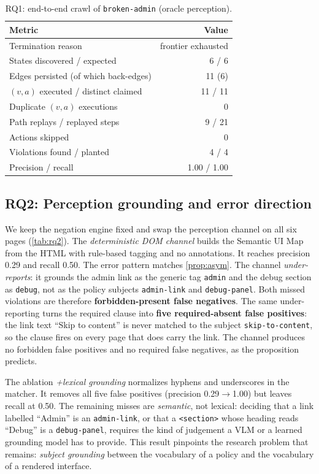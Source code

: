 \begin{table}[t]
\centering\small
\caption{RQ1: end-to-end crawl of \texttt{broken-admin} (oracle perception).}
\label{tab:rq1}
\begin{tabular}{@{}lr@{}}
\toprule
Metric & Value \\
\midrule
Termination reason & frontier exhausted \\
States discovered / expected & 6 / 6 \\
Edges persisted (of which back-edges) & 11 (6) \\
$(v,a)$ executed / distinct claimed & 11 / 11 \\
Duplicate $(v,a)$ executions & 0 \\
Path replays / replayed steps & 9 / 21 \\
Actions skipped & 0 \\
Violations found / planted & 4 / 4 \\
Precision / recall & 1.00 / 1.00 \\
\bottomrule
\end{tabular}
\end{table}

\subsection{RQ2: Perception grounding and error direction}
\label{sec:eval:rq2}

We keep the negation engine fixed and swap the perception channel on all six
pages (\cref{tab:rq2}). The \emph{deterministic DOM channel} builds the
Semantic UI Map from the HTML with rule-based tagging and no annotations. It
reaches precision 0.29 and recall 0.50. The error pattern matches
\cref{prop:asym}. The channel \emph{under-reports}: it grounds the admin link
as the generic tag \texttt{admin} and the debug section as \texttt{debug}, not
as the policy subjects \texttt{admin-link} and \texttt{debug-panel}. Both
missed violations are therefore \textbf{forbidden-present false negatives}. The
same under-reporting turns the required clause into \textbf{five
required-absent false positives}: the link text ``Skip to content'' is never
matched to the subject \texttt{skip-to-content}, so the clause fires on every
page that does carry the link. The channel produces no forbidden false
positives and no required false negatives, as the proposition predicts.

The ablation \emph{+lexical grounding} normalizes hyphens and underscores in
the matcher. It removes all five false positives (precision
0.29$\to$1.00) but leaves recall at 0.50. The remaining misses are
\emph{semantic}, not lexical: deciding that a link labelled ``Admin'' is an
\texttt{admin-link}, or that a \texttt{<section>} whose heading reads
``Debug'' is a \texttt{debug-panel}, requires the kind of judgement a VLM or a
learned grounding model has to provide. This result pinpoints the research
problem that remains: \emph{subject grounding} between the vocabulary of a
policy and the vocabulary of a rendered interface.

